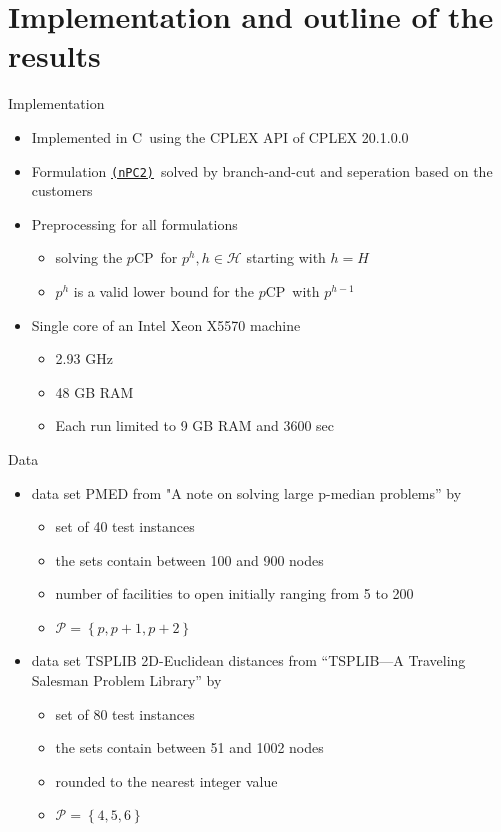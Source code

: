 \documentclass[utf8,aspectratio=169,ngerman,english]{beamer}
\renewcommand{\emph}[1]{\textcolor{jkuGreen}{#1}}
\def\Cplusplus{C\raisebox{0.5ex}{\tiny\textbf{++}}}
\newcommand{\nPCY}{\hyperref[eq:nPCY]{\texttt{(nPC2)}}}
\newcommand{\pCP}{$p$CP}
\begin{document}
\section{Implementation and outline of the results}
\begin{frame}{Implementation}
    \begin{itemize}
        \item Implemented in \Cplusplus\ using the CPLEX API of CPLEX 20.1.0.0
        \item Formulation \nPCY\ solved by branch-and-cut and seperation based on the customers
        \item Preprocessing for all formulations
        \begin{itemize}
            \item solving the \pCP\ for $p^h, h \in \mathcal H$ starting with $h = H$
            \item $p^h$ is a valid lower bound for the \pCP\ with $p^{h-1}$
        \end{itemize}
        \item Single core of an Intel Xeon X5570 machine
        \begin{itemize}
            \item 2.93 GHz
            \item 48 GB RAM
            \item Each run limited to 9 GB RAM and 3600 sec
        \end{itemize}
    \end{itemize}
\end{frame}
\begin{frame}{Data}
    \vspace*{-2pt}
    \begin{itemize}
    \setlength\itemsep{1em}
        \item data set \emph{PMED} from "A note on solving large p-median problems” by \textcite{Beasley1985}
        \begin{itemize}
            \item set of 40 test instances
            \item the sets contain between 100 and 900 nodes
            \item number of facilities to open initially ranging from 5 to 200
            \item $\mathcal P = \left \{p, p+1, p+2\right \}$
        \end{itemize} \pause
        \item data set \emph{TSPLIB} 2D-Euclidean distances from “TSPLIB—A Traveling Salesman Problem Library” by \textcite{Reinelt1991}
        \begin{itemize}
            \item set of 80 test instances
            \item the sets contain between 51 and 1002 nodes
            \item rounded to the nearest integer value
            \item $\mathcal P = \left \{4, 5, 6\right \}$
        \end{itemize}
    \end{itemize}
\end{frame}
\end{document}

